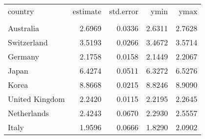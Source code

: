 \begin{tabular}{lrrrr}
   \toprule 
 
country & estimate & std.error & ymin & ymax \\ 

\cmidrule(lr){1-5} 
 
\\[-1.8ex]  
 
Australia & 2.6969 & 0.0336 & 2.6311 & 2.7628 \\ 
  Switzerland & 3.5193 & 0.0266 & 3.4672 & 3.5714 \\ 
  Germany & 2.1758 & 0.0158 & 2.1449 & 2.2067 \\ 
  Japan & 6.4274 & 0.0511 & 6.3272 & 6.5276 \\ 
  Korea & 8.8668 & 0.0215 & 8.8246 & 8.9090 \\ 
  United Kingdom & 2.2420 & 0.0115 & 2.2195 & 2.2645 \\ 
  Netherlands & 2.4243 & 0.0670 & 2.2930 & 2.5557 \\ 
  Italy & 1.9596 & 0.0666 & 1.8290 & 2.0902 \\ 
   \bottomrule  
\end{tabular}
